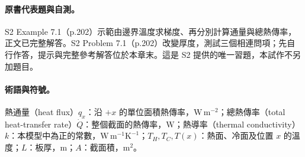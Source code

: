 \paragraph{原書代表題與自測。}
S2 Example 7.1（p.202）示範由邊界溫度求梯度、再分別計算通量與總熱傳率，正文已完整解答。S2 Problem 7.1（p.202）改變厚度，測試三個相連問項；先自行作答，提示與完整參考解答位於本章末。這是 S2 提供的唯一習題，本試作不另加題目。

\paragraph{術語與符號。}
熱通量（heat flux）\(q_x\)：沿 \(+x\) 的單位面積熱傳率，\(\mathrm{W\,m^{-2}}\)；總熱傳率（total heat-transfer rate）\(\dot Q\)：整個截面的熱傳率，\(\mathrm W\)；熱導率（thermal conductivity）\(k\)：本模型中為正的常數，\(\mathrm{W\,m^{-1}K^{-1}}\)；\(T_H,T_C,T(x)\)：熱面、冷面及位置 \(x\) 的溫度；\(L\)：板厚，\(\mathrm m\)；\(A\)：截面積，\(\mathrm{m^2}\)。
